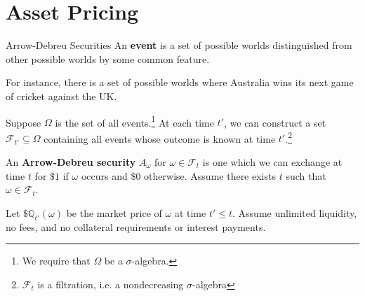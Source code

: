\documentclass{beamer}
\begin{document}
\section{Asset Pricing}
\begin{frame}{Arrow-Debreu Securities}
	An \textbf{event} is a set of possible worlds distinguished from other possible worlds by some common feature.

	For instance, there is a set of possible worlds where Australia wins its next game of cricket against the UK.%

	Suppose $\Omega$ is the set of all events.\footnote{We require that $\Omega$ be a $\sigma$-algebra.} At each time $t'$, we can construct a set $\mathcal{F}_{t'}\subseteq \Omega$ containing all events whose outcome is known at time $t'$.\footnote{$\mathcal{F}_t$ is a filtration, i.e. a nondecreasing $\sigma$-algebra}

	An \textbf{Arrow-Debreu security} $A_\omega$ for $\omega\in \mathcal{F}_t$ is one which we can exchange at time $t$ for $\$1$ if $\omega$ occurs and $\$0$ otherwise. Assume there exists $t$ such that $\omega\in\mathcal{F}_t$.

	Let $\$\mathbb{Q}_{t'}(\omega)$ be the market price of $\omega$ at time $t'\leq t$. Assume unlimited liquidity, no fees, and no collateral requirements or interest payments.
\end{frame}
\end{document}
